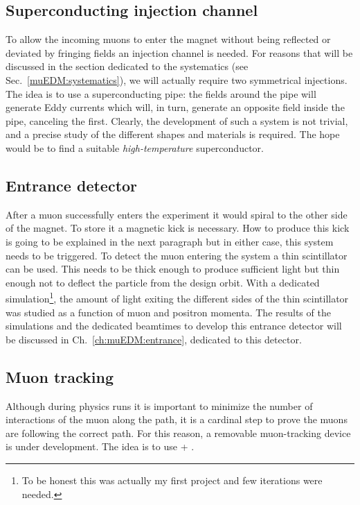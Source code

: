 \begin{refsection}
    \subsection{Superconducting injection channel}
        To allow the incoming muons to enter the magnet without being reflected or deviated by fringing fields an injection channel is needed.
        For reasons that will be discussed in the section dedicated to the systematics (see Sec.~\ref{muEDM:systematics}), we will actually require two symmetrical injections.
        The idea is to use a superconducting pipe: the fields around the pipe will generate Eddy currents which will, in turn, generate an opposite field inside the pipe, canceling the first.
        Clearly, the development of such a system is not trivial, and a precise study of the different shapes and materials is required. 
        The hope would be to find a suitable \textit{high-temperature} superconductor.

    \subsection{Entrance detector} 
        After a muon successfully enters the experiment it would spiral to the other side of the magnet. 
        To store it a magnetic kick is necessary. 
        How to produce this kick is going to be explained in the next paragraph but in either case, this system needs to be triggered.
        To detect the muon entering the system a thin scintillator can be used.
        This needs to be thick enough to produce sufficient light but thin enough not to deflect the particle from the design orbit.
        With a dedicated \gf simulation\footnote{To be honest this was actually my first \gf project and few iterations were needed.}, the amount of light exiting the different sides of the thin scintillator was studied as a function of muon and positron momenta. 
        The results of the simulations and the dedicated beamtimes to develop this entrance detector will be discussed in Ch.~\ref{ch:muEDM:entrance}, dedicated to this detector.

    \subsection{Muon tracking} 
        Although during physics runs it is important to minimize the number of interactions of the muon along the path, it is a cardinal step to prove the muons are following the correct path.
        For this reason, a removable muon-tracking device is under development.
        The idea is to use \tpc + \grid. \cite{muEDM:PSI:GridPix}


\end{refsection}

